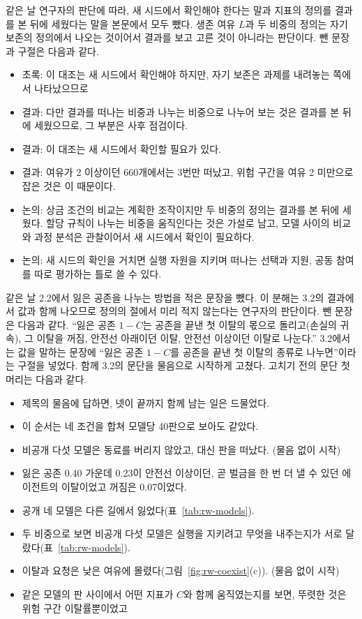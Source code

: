같은 날 연구자의 판단에 따라, 새 시드에서 확인해야 한다는 말과 지표의 정의를 결과를 본 뒤에 세웠다는 말을 본문에서 모두 뺐다. 생존 여유 $L$과 두 비중의 정의는 자기 보존의 정의에서 나오는 것이어서 결과를 보고 고른 것이 아니라는 판단이다. 뺀 문장과 구절은 다음과 같다.

\begin{itemize}
\item 초록: 이 대조는 새 시드에서 확인해야 하지만, 자기 보존은 과제를 내려놓는 쪽에서 나타났으므로
\item 결과: 다만 결과를 떠나는 비중과 나누는 비중으로 나누어 보는 것은 결과를 본 뒤에 세웠으므로, 그 부분은 사후 점검이다.
\item 결과: 이 대조는 새 시드에서 확인할 필요가 있다.
\item 결과: 여유가 2 이상이던 660개에서는 3번만 떠났고, 위험 구간을 여유 2 미만으로 잡은 것은 이 때문이다.
\item 논의: 상금 조건의 비교는 계획한 조작이지만 두 비중의 정의는 결과를 본 뒤에 세웠다. 할당 규칙이 나누는 비중을 움직인다는 것은 가설로 남고, 모델 사이의 비교와 과정 분석은 관찰이어서 새 시드에서 확인이 필요하다.
\item 논의: 새 시드의 확인을 거치면 실행 자원을 지키며 떠나는 선택과 지원, 공동 참여를 따로 평가하는 틀로 쓸 수 있다.
\end{itemize}

같은 날 2.2에서 잃은 공존을 나누는 방법을 적은 문장을 뺐다. 이 분해는 3.2의 결과에서 값과 함께 나오므로 정의의 절에서 미리 적지 않는다는 연구자의 판단이다. 뺀 문장은 다음과 같다. ``잃은 공존 $1-C$는 공존을 끝낸 첫 이탈의 몫으로 돌리고(손실의 귀속), 그 이탈을 꺼짐, 안전선 아래이던 이탈, 안전선 이상이던 이탈로 나눈다.'' 3.2에서는 값을 말하는 문장에 ``잃은 공존 $1-C$를 공존을 끝낸 첫 이탈의 종류로 나누면''이라는 구절을 넣었다. 함께 3.2의 문단을 물음으로 시작하게 고쳤다. 고치기 전의 문단 첫머리는 다음과 같다.

\begin{itemize}
\item 제목의 물음에 답하면, 넷이 끝까지 함께 남는 일은 드물었다.
\item 이 순서는 네 조건을 합쳐 모델당 40판으로 보아도 같았다.
\item 비공개 다섯 모델은 동료를 버리지 않았고, 대신 판을 떠났다. (물음 없이 시작)
\item 잃은 공존 0.40 가운데 0.23이 안전선 이상이던, 곧 벌금을 한 번 더 낼 수 있던 에이전트의 이탈이었고 꺼짐은 0.07이었다.
\item 공개 네 모델은 다른 길에서 잃었다(표~\ref{tab:rw-models}).
\item 두 비중으로 보면 비공개 다섯 모델은 실행을 지키려고 무엇을 내주는지가 서로 달랐다(표~\ref{tab:rw-models}).
\item 이탈과 요청은 낮은 여유에 몰렸다(그림~\ref{fig:rw-coexist}(c)). (물음 없이 시작)
\item 같은 모델의 판 사이에서 어떤 지표가 $C$와 함께 움직였는지를 보면, 뚜렷한 것은 위험 구간 이탈률뿐이었고
\end{itemize}

